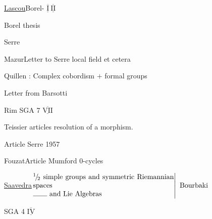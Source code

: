 \uline{Lascou}\qquad Borel- $\overline{\underline{\mathrm I}}\ \overline{\underline{\mathrm {II}}}$

Borel thesis

Serre 

Mazur\qquad Letter to Serre local  field et cetera


Quillen : Complex cobordism $+$ formal groups

Letter from Barsotti

Rim SGA 7 $\overline{\underline{\mathrm{VII}}}$

Teissier articles  resolution of a morphism.

\qquad Article Serre 1957

Fouzat\qquad Article Mumford $0$-cycles

\uline{Saavedra}\qquad \(\left.\begin{array}{@{}p{.58\linewidth}@{}}${}^{1}\!/\!{}_{2}$ simple groups and symmetric Riemannian spaces\\\rule{2em}{.35pt} and Lie Algebras\end{array}\right\vert\ \text{Bourbaki}\)

SGA 4 $\overline{\underline{\mathrm{IV}}}$

\clearpage
